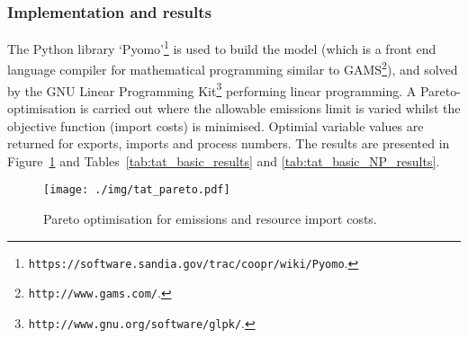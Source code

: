 \subsubsection*{Implementation and results}
The Python library `Pyomo'\footnote{\texttt{https://software.sandia.gov/trac/coopr/wiki/Pyomo}.} is used to build the model (which is a front end language compiler for mathematical programming similar to GAMS\footnote{\texttt{http://www.gams.com/}.}), and solved by the GNU Linear Programming Kit\footnote{\texttt{http://www.gnu.org/software/glpk/}.} performing linear programming. A Pareto-optimisation is carried out where the allowable emissions limit is varied whilst the objective function (import costs) is minimised. Optimial variable values are returned for exports, imports and process numbers. The results are presented in Figure~\ref{fig:tat_pareto} and Tables~\ref{tab:tat_basic_results} and \ref{tab:tat_basic_NP_results}.
\begin{figure}
	\centering
	\texttt{[image: ./img/tat\_pareto.pdf]}
	\caption{Pareto optimisation for emissions and resource import costs.} \label{fig:tat_pareto}
\end{figure}
 
 


